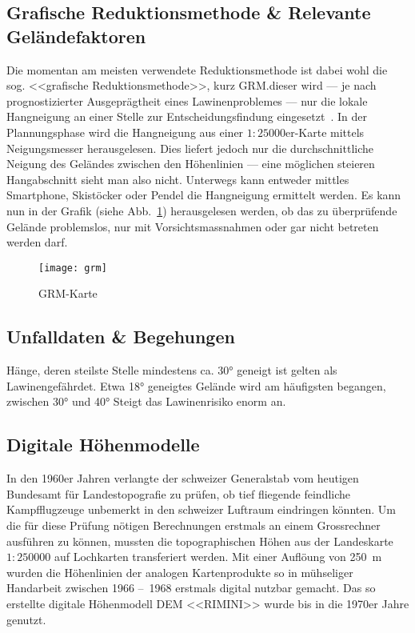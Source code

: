 \subsection{Grafische Reduktionsmethode \& Relevante Geländefaktoren}

Die momentan am meisten verwendete Reduktionsmethode ist dabei wohl die sog. <<grafische Reduktionsmethode>>, kurz GRM.\@Bei dieser wird --- je nach prognostizierter Ausgeprägtheit eines Lawinenproblemes --- nur die lokale Hangneigung an einer Stelle zur Entscheidungsfindung eingesetzt~\cite{sacbergspwinter}. In der Plannungsphase wird die Hangneigung aus einer $1:25000$er-Karte mittels Neigungsmesser herausgelesen. Dies liefert jedoch nur die durchschnittliche Neigung des Geländes zwischen den Höhenlinien --- eine möglichen steieren Hangabschnitt sieht man also nicht.
Unterwegs kann entweder mittles Smartphone, Skistöcker oder Pendel die Hangneigung ermittelt werden. Es kann nun in der Grafik (siehe Abb.\ \ref{fig:grm}) herausgelesen werden, ob das zu überprüfende Gelände problemslos, nur mit Vorsichtsmassnahmen oder gar nicht betreten werden darf.

\begin{figure}[H]
  \centering
  \texttt{[image: grm]}
  \caption{GRM-Karte~\cite{achtunglawine}}\label{fig:grm}
\end{figure}



\subsection{Unfalldaten \& Begehungen}

Hänge, deren steilste Stelle mindestens ca. 30° geneigt ist gelten als Lawinengefährdet. Etwa 18° geneigtes Gelände wird am häufigsten begangen, zwischen 30° und 40° Steigt das Lawinenrisiko enorm an.~\cite{sacbergspwinterp99} 






\subsection{Digitale Höhenmodelle}\label{sec:dem}

In den 1960er Jahren verlangte der schweizer Generalstab vom heutigen Bundesamt für Landestopografie zu prüfen, ob tief fliegende feindliche Kampfflugzeuge unbemerkt in den schweizer Luftraum eindringen könnten. Um die für diese Prüfung nötigen Berechnungen erstmals an einem Grossrechner ausführen zu können, mussten die topographischen Höhen aus der Landeskarte $1:250000$ auf Lochkarten transferiert werden. Mit einer Auflöung von \qty{250}{m} wurden die Höhenlinien der analogen Kartenprodukte so in mühseliger Handarbeit zwischen 1966 --~1968 erstmals digital nutzbar gemacht. Das so erstellte digitale Höhenmodell DEM <<RIMINI>> wurde bis in die 1970er Jahre genutzt.~\cite{swisstopohistdem}

